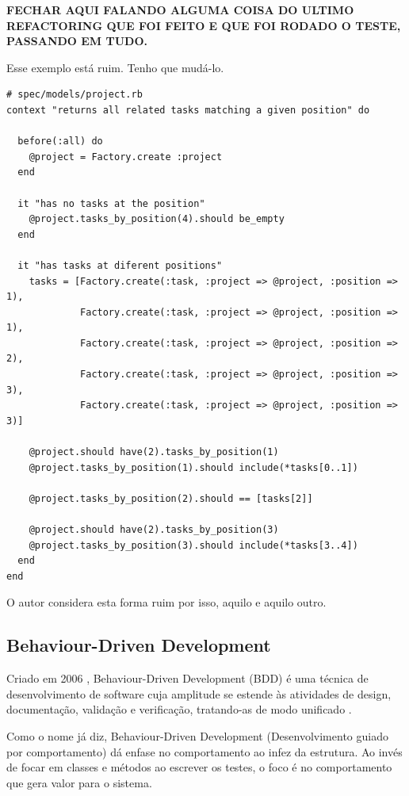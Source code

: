 \textbf{FECHAR AQUI FALANDO ALGUMA COISA DO ULTIMO REFACTORING QUE FOI FEITO E QUE FOI RODADO O TESTE, PASSANDO EM TUDO.}

Esse exemplo está ruim. Tenho que mudá-lo.

\begin{lstlisting}[caption=Teste do método Project\#tasks\_by\_position escrito de uma outra forma,label=code:tdd_spec_outra_forma]
# spec/models/project.rb
context "returns all related tasks matching a given position" do

  before(:all) do
    @project = Factory.create :project
  end

  it "has no tasks at the position"
    @project.tasks_by_position(4).should be_empty
  end

  it "has tasks at diferent positions"
    tasks = [Factory.create(:task, :project => @project, :position => 1),
             Factory.create(:task, :project => @project, :position => 1),
             Factory.create(:task, :project => @project, :position => 2),
             Factory.create(:task, :project => @project, :position => 3),
             Factory.create(:task, :project => @project, :position => 3)]

    @project.should have(2).tasks_by_position(1)
    @project.tasks_by_position(1).should include(*tasks[0..1])

    @project.tasks_by_position(2).should == [tasks[2]]

    @project.should have(2).tasks_by_position(3)
    @project.tasks_by_position(3).should include(*tasks[3..4])
  end
end
\end{lstlisting}

O autor considera esta forma ruim por isso, aquilo e aquilo outro.


\subsection{Behaviour-Driven Development}

Criado em 2006 \cite{IntroducingBDD}, Behaviour-Driven Development (BDD) é uma técnica de desenvolvimento de software cuja amplitude se estende às atividades de design, documentação, validação e verificação, tratando-as de modo unificado \cite{BDDRodrigo}.

Como o nome já diz, Behaviour-Driven Development (Desenvolvimento guiado por comportamento) dá enfase no comportamento ao infez da estrutura. Ao invés de focar em classes e métodos ao escrever os testes, o foco é no comportamento que gera valor para o sistema.

